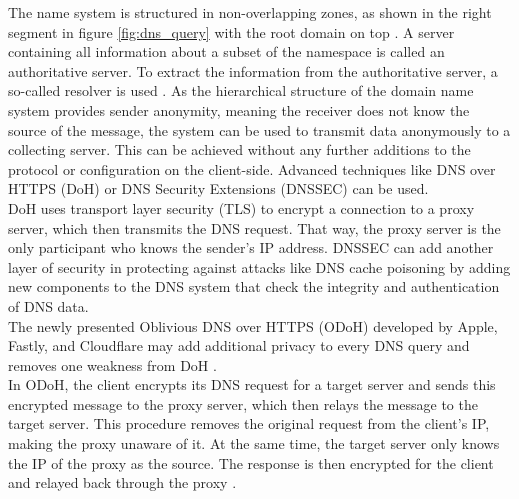         The name system is structured in non-overlapping zones, as shown in the right segment in figure \ref{fig:dns_query} with the root domain on top \cite{herrmann_beobachtungsmoglichkeiten_2016}.
        A server containing all information about a subset of the namespace is called an authoritative server. To extract the information from the authoritative server, a so-called resolver is used \cite{friedewald_privacy_2018}.
        As the hierarchical structure of the domain name system provides sender anonymity, meaning the receiver does not know the source of the message, the system can be used to transmit data anonymously to a collecting server. This can be achieved without any further additions to the protocol or configuration on the client-side.
        Advanced techniques like DNS over HTTPS (DoH) \cite{ermert_cloudflare_2020} \cite{mcmanus_dns_2018} or DNS Security Extensions (DNSSEC) \cite{larson_dns_2005} can be used.\\
        DoH uses transport layer security (TLS) to encrypt a connection to a proxy server, which then transmits the DNS request. That way, the proxy server is the only participant who knows the sender's IP address. DNSSEC can add another layer of security in protecting against attacks like DNS cache poisoning by adding new components to the DNS system that check the integrity and authentication of DNS data.\\
        The newly presented Oblivious DNS over HTTPS (ODoH) developed by Apple, Fastly, and Cloudflare may add additional privacy to every DNS query and removes one weakness from DoH \cite{verma_improving_2020}.\\
        In ODoH, the client encrypts its DNS request for a target server and sends this encrypted message to the proxy server, which then relays the message to the target server. This procedure removes the original request from the client's IP, making the proxy unaware of it.
        At the same time, the target server only knows the IP of the proxy as the source. The response is then encrypted for the client and relayed back through the proxy \cite{verma_improving_2020}.
        
        
        
        
